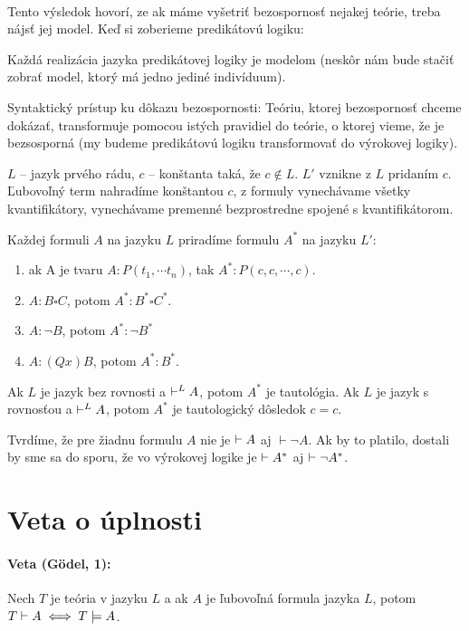 \paragraph{}
\par Tento výsledok hovorí, ze ak máme vyšetriť bezospornosť nejakej teórie,
treba nájsť jej model. Keď si zoberieme predikátovú logiku:

\par Každá realizácia jazyka predikátovej logiky je modelom (neskôr nám bude
stačiť zobrať model, ktorý má jedno jediné indivíduum).  

\par
Syntaktický prístup ku dôkazu bezospornosti: Teóriu, ktorej bezospornosť chceme
dokázať, transformuje pomocou istých pravidiel do teórie, o ktorej vieme, že je
bezsosporná  (my budeme predikátovú logiku transformovať do výrokovej logiky).

\par $L$ -- jazyk prvého rádu, $c$ -- konštanta taká, že $c \notin L$. $L'$
vznikne z $L$ pridaním $c$. Ľubovoľný term nahradíme konštantou $c$, z formuly
vynechávame všetky kvantifikátory, vynechávame premenné bezprostredne spojené s
kvantifikátorom.

\par Každej formuli $A$ na jazyku $L$ priradíme formulu $A^*$ na jazyku $L'$:
\begin{enumerate}
	\item ak A je tvaru $A: P(t_1, \cdots t_n)$, tak $A^*: P(c, c, \cdots,c)$.
	\item $A: B \square C$, potom $A^*: B^* \square C^*$.
	\item $A: \neg B$, potom $A^*: \neg B^*$
	\item $A: (Qx) B$, potom $A^*: B^*$.
\end{enumerate}

Ak $L$ je jazyk bez rovnosti a $\vdash^L A$, potom $A^*$ je tautológia. Ak $L$
je jazyk s rovnosťou a $\vdash^L A$, potom $A^*$ je tautologický dôsledok $c=c$.

\par Tvrdíme, že pre žiadnu formulu $A$ nie je $\vdash A$ aj $\vdash \neg A$. Ak
by to platilo, dostali by sme sa do sporu, že vo výrokovej logike je $\vdash
A^*$ aj $\vdash \neg A^*$.


\section{Veta o úplnosti}
\paragraph{Veta (G\"odel, 1):} Nech $T$ je teória v jazyku $L$ a ak $A$ je
ľubovoľná formula jazyka $L$, potom $T \vdash A \iff T \models A$.

